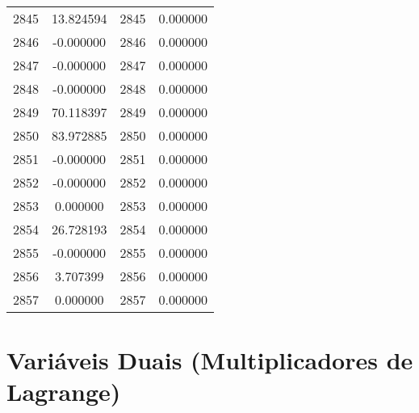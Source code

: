 \documentclass[12pt]{article}
\begin{document}
\begin{longtable}{@{}cccc@{}}
2845 & 13.824594 & 2845 & 0.000000 \\
2846 & -0.000000 & 2846 & 0.000000 \\
2847 & -0.000000 & 2847 & 0.000000 \\
2848 & -0.000000 & 2848 & 0.000000 \\
2849 & 70.118397 & 2849 & 0.000000 \\
2850 & 83.972885 & 2850 & 0.000000 \\
2851 & -0.000000 & 2851 & 0.000000 \\
2852 & -0.000000 & 2852 & 0.000000 \\
2853 & 0.000000 & 2853 & 0.000000 \\
2854 & 26.728193 & 2854 & 0.000000 \\
2855 & -0.000000 & 2855 & 0.000000 \\
2856 & 3.707399 & 2856 & 0.000000 \\
2857 & 0.000000 & 2857 & 0.000000 \\

\end{longtable}

\section{Variáveis Duais (Multiplicadores de Lagrange)}
\end{document}
